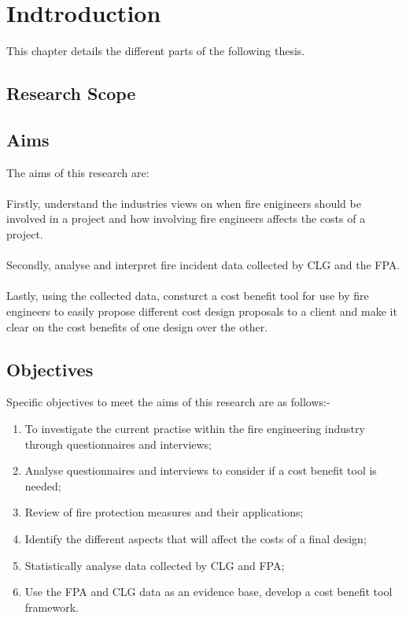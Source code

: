 \documentclass[table,a4paper,oneside]{book}
\begin{document}
\doublespacing

\chapter{Indtroduction}
\label{chap:Introduction}

This chapter details the different parts of the following thesis.

\section{Research Scope}
\label{sec:Scope}


\section{Aims}
\label{sec:Aims}
The aims of this research are:
\\
\\
Firstly, understand the industries views on when fire enigineers should be involved in a project and how involving fire engineers affects the costs of a project.
\\
\\
Secondly, analyse and interpret fire incident data collected by \ac{CLG} and the \ac{FPA}.
\\
\\
Lastly, using the collected data, consturct a cost benefit tool for use by fire engineers to easily propose different cost design proposals to a client and make it clear on the cost benefits of one design over the other.

\section{Objectives}
\label{sec:Objectives}
Specific objectives to meet the aims of this research are as follows:-

\begin{enumerate}
	\item To investigate the current practise within the fire engineering industry through questionnaires and interviews;
	\item Analyse questionnaires and interviews to consider if a cost benefit tool is needed;
	\item Review of fire protection measures and their applications;
	\item Identify the different aspects that will affect the costs of a final design;
	\item Statistically analyse data collected by \ac{CLG} and \ac{FPA};
	\item Use the \ac{FPA} and \ac{CLG} data as an evidence base, develop a cost benefit tool framework.
\end{enumerate}
\end{document}
